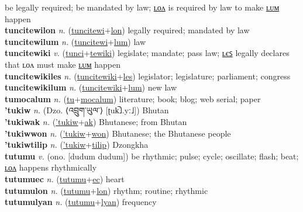 be legally required; be mandated by law; \hyperref[tuncitewilon]{ʟᴏᴧ} is required by law to make \hyperref[tuncitewilum]{ʟᴜᴍ} happen \label{tuncitewi} \\
\textbf{tuncitewilon} \textit{n.} (\hyperref[tuncitewi]{tuncitewi}+\hyperref[lon]{lon})
legally required; mandated by law \label{tuncitewilon} \\
\textbf{tuncitewilum} \textit{n.} (\hyperref[tuncitewi]{tuncitewi}+\hyperref[lum]{lum})
law \label{tuncitewilum} \\
\textbf{tuncitewiki} \textit{v.} (\hyperref[tunci]{tunci}+\hyperref[tewiki]{tewiki})
legislate; mandate; pass law; \hyperref[tuncitewikiles]{ʟєꜱ} legally declares that ʟᴏᴧ must make \hyperref[tuncitewikilum]{ʟᴜᴍ} happen \label{tuncitewiki} \\
\textbf{tuncitewikiles} \textit{n.} (\hyperref[tuncitewiki]{tuncitewiki}+\hyperref[les]{les})
legislator; legislature; parliament; congress \label{tuncitewikiles} \\
\textbf{tuncitewikilum} \textit{n.} (\hyperref[tuncitewiki]{tuncitewiki}+\hyperref[lum]{lum})
new law \label{tuncitewikilum} \\
\textbf{tumocalum} \textit{n.} (\hyperref[tu]{tu}+\hyperref[mocalum]{mocalum})
literature; book; blog; web serial; paper \label{tumocalum} \\
\textbf{'tukiw} \textit{n.} (Dzo. ⟨འབྲུག་ཡུལ་⟩ [ʈuk̚˩.yː˩])
Bhutan \label{'tukiw} \\
\textbf{'tukiwak} \textit{n.} (\hyperref['tukiw]{'tukiw}+\hyperref[ak]{ak})
Bhutanese; from Bhutan \label{'tukiwak} \\
\textbf{'tukiwwon} \textit{n.} (\hyperref['tukiw]{'tukiw}+\hyperref[won]{won})
Bhutanese; the Bhutanese people \label{'tukiwwon} \\
\textbf{'tukiwtilip} \textit{n.} (\hyperref['tukiw]{'tukiw}+\hyperref[tilip]{tilip})
Dzongkha \label{'tukiwtilip} \\
\textbf{tutumu} \textit{v.} (ono. [dudum dudum])
be rhythmic; pulse; cycle; oscillate; flash; beat; \hyperref[tutumulon]{ʟᴏᴧ} happens rhythmically \label{tutumu} \\
\textbf{tutumuec} \textit{n.} (\hyperref[tutumu]{tutumu}+\hyperref[ec]{ec})
heart \label{tutumuec} \\
\textbf{tutumulon} \textit{n.} (\hyperref[tutumu]{tutumu}+\hyperref[lon]{lon})
rhythm; routine; rhythmic \label{tutumulon} \\
\textbf{tutumulyan} \textit{n.} (\hyperref[tutumu]{tutumu}+\hyperref[lyan]{lyan})
frequency \label{tutumulyan} \\
